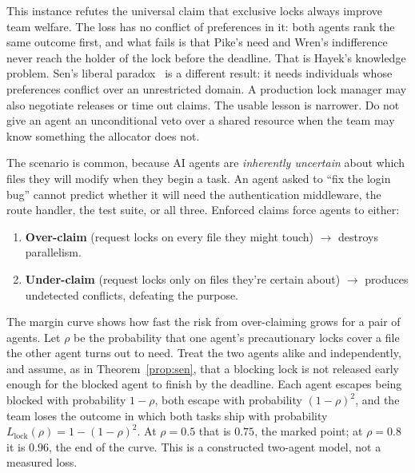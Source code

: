 \documentclass[11pt,a4paper]{article}
\theoremstyle{definition}
\theoremstyle{remark}
\begin{document}


This instance refutes the universal claim that exclusive locks always improve team welfare. The loss has no conflict of preferences in it: both agents rank the same outcome first, and what fails is that Pike's need and Wren's indifference never reach the holder of the lock before the deadline. That is Hayek's knowledge problem. Sen's liberal paradox~ is a different result: it needs individuals whose preferences conflict over an unrestricted domain. A production lock manager may also negotiate releases or time out claims. The usable lesson is narrower. Do not give an agent an unconditional veto over a shared resource when the team may know something the allocator does not.

The scenario is common, because AI agents are \emph{inherently uncertain} about which files they will modify when they begin a task. An agent asked to ``fix the login bug'' cannot predict whether it will need the authentication middleware, the route handler, the test suite, or all three. Enforced claims force agents to either:
\begin{enumerate}[nosep]
  \item \textbf{Over-claim} (request locks on every file they might touch) $\rightarrow$ destroys parallelism.
  \item \textbf{Under-claim} (request locks only on files they're certain about) $\rightarrow$ produces undetected conflicts, defeating the purpose.
\end{enumerate}

The margin curve shows how fast the risk from over-claiming grows for a pair of agents. Let
$\rho$ be the probability that one agent's precautionary locks cover a file
the other agent turns out to need. Treat the two agents alike and
independently, and assume, as in Theorem~\ref{prop:sen}, that a blocking lock
is not released early enough for the blocked agent to finish by the deadline. Each agent escapes being blocked with
probability $1-\rho$, both escape with probability $(1-\rho)^2$, and the team
loses the outcome in which both tasks ship with probability
$L_{\mathrm{lock}}(\rho)=1-(1-\rho)^2$. At $\rho=0.5$ that is $0.75$, the marked point; at
$\rho=0.8$ it is $0.96$, the end of the curve. This is a constructed two-agent
model, not a measured loss.
\end{document}
